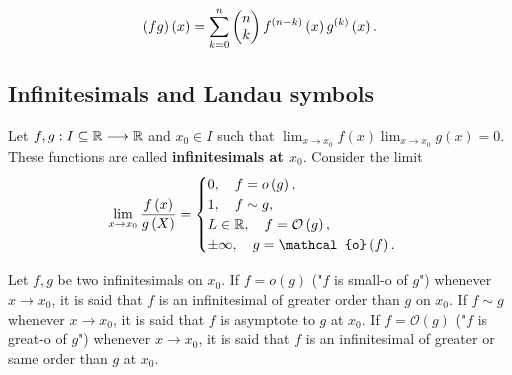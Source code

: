 
\begin{defi}
    \begin{equation}
        \left( fg \right)\left( x \right) = \sum_{k=0}^n\left( \begin{matrix} n \\ k \end{matrix} \right) f^{\left( n - k \right) }\left( x \right) g^{\left( k \right) }\left( x \right).
    \end{equation}
\end{defi}

\subsection{Infinitesimals and Landau symbols}
Let $f, g : I\subseteq\mathbb{R}\longrightarrow \mathbb{R}$ and $x_0\in I$ such that $\lim_{x\to x_0} f\left( x \right) \lim_{x\to x_0} g\left( x \right) = 0$. These functions are called \textbf{infinitesimals at $x_0$}. Consider the limit
\begin{equation}
    \lim_{x\to x_0}\frac{f\left( x \right) }{g\left( X \right) }= \begin{cases}
        0, \quad f = o\left( g \right), \\
        1, \quad f\sim g,\\
        L\in\R, \quad f = \mathcal{O}\left( g \right), \\
        \pm\infty,\quad g = \mathcal{o}\left( f \right).
    \end{cases}
\end{equation}

\begin{defi}[Infinitesimals]
    Let $f, g$ be two infinitesimals on $x_0$. If $f = o\left( g \right) $ ("$f$ is small-o of $g$")
    whenever $x\to x_0$, it is said that $f$ is an infinitesimal of greater order than $g$ on $x_0$. If
    $f\sim g$ whenever $x\to x_0$, it is said that $f$ is asymptote to $g$ at $x_0$. If $f = \mathcal{O}\left( g \right) $ ("$f$ is great-o of $g$") whenever $x\to x_0$, it is said that $f$ is an infinitesimal of greater
    or same order than $g$ at $x_0$.
\end{defi}

